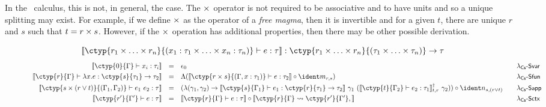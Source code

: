 In the \clstr~calculus, this is not, in general, the case. The $\times$ operator is not required 
to be associative and to have units and so a unique splitting may exist.  For example, if we
define $\times$ as the operator of a \emph{free magma}, then it is invertible and for a given
$t$, there are unique $r$ and $s$ such that $t = r \times s$. However, if the $\times$ operation 
has additional properties, then there may be other possible derivation.



\begin{figure*}[t]
\newcommand{\uu}[1]{\overline{#1}}
\begin{equation*}
\cosem{\ctyp{r_1 \csprd \ldots \csprd r_n}{(x_1 : \tau_1 \times \ldots \times x_n : \tau_n)} \vdash e : \tau} : 
  \ctyp{r_1 \csprd \ldots \csprd r_n}{(\tau_1 \times \ldots \times \tau_n)} \rightarrow \tau
\end{equation*}
\begin{equation*}
\begin{array}{rcll}
\cosem{\ctyp{0}{\Gamma} \vdash x_i : \tau_i} &=&
    \epsilon_0                                                                   &\quad$\ruless{var}$
\\[0.32em]
\cosem{\ctyp{r}{\Gamma} \vdash \lambda x.e : \ctyp{s}{\tau_1} \rightarrow \tau_2} &=& 
    \Lambda (\cosem{\ctyp{r \csprd s}{(\Gamma, x:\tau_1)} \vdash e : \tau_2} \circ \cmerge_{r, s})    &\quad$\ruless{fun}$
\\[0.32em]
\cosem{\ctyp{s \csprd (r \csvop t)}{(\Gamma_1, \Gamma_2)} \vdash e_1~e_2 : \tau} &=& 
    (\lambda (\gamma_1, \gamma_2) \rightarrow
    \cosem{\ctyp{s}{\Gamma_1} \vdash e_1 : \ctyp{r}{\tau_1} \rightarrow \tau_2}~\gamma_1~
    (\cobind{\cosem{\ctyp{t}{\Gamma_2}\vdash e_2 : \tau_1}}{t,r}~\gamma_2)) \circ \csplit_{s,(r \vee t)}  &\quad$\ruless{app}$
\\[0.32em]
\cosem{\ctyp{r'}{\Gamma'} \vdash e : \tau} &=&
    \cosem{\ctyp{r}{\Gamma} \vdash e : \tau} \circ \cosem{\ctxtrans{\ctyp{r'}{\Gamma'}}{\ctyp{r}{\Gamma}}}       &\quad$\ruless{ctx}$
\end{array}
\end{equation*}


\end{figure*}
